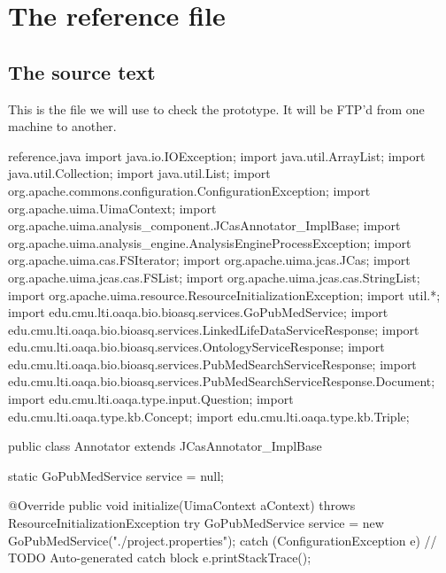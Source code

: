 \chapter{The reference file}
\section{The source text}
This is the file we will use to check the prototype. 
It will be FTP'd from one machine to another.
\begin{chunk}{reference.java}
import java.io.IOException;
import java.util.ArrayList;
import java.util.Collection;
import java.util.List;
import org.apache.commons.configuration.ConfigurationException;
import org.apache.uima.UimaContext;
import org.apache.uima.analysis_component.JCasAnnotator_ImplBase;
import org.apache.uima.analysis_engine.AnalysisEngineProcessException;
import org.apache.uima.cas.FSIterator;
import org.apache.uima.jcas.JCas;
import org.apache.uima.jcas.cas.FSList;
import org.apache.uima.jcas.cas.StringList;
import org.apache.uima.resource.ResourceInitializationException;
import util.*;
import edu.cmu.lti.oaqa.bio.bioasq.services.GoPubMedService;
import edu.cmu.lti.oaqa.bio.bioasq.services.LinkedLifeDataServiceResponse;
import edu.cmu.lti.oaqa.bio.bioasq.services.OntologyServiceResponse;
import edu.cmu.lti.oaqa.bio.bioasq.services.PubMedSearchServiceResponse;
import edu.cmu.lti.oaqa.bio.bioasq.services.PubMedSearchServiceResponse.Document;
import edu.cmu.lti.oaqa.type.input.Question;
import edu.cmu.lti.oaqa.type.kb.Concept;
import edu.cmu.lti.oaqa.type.kb.Triple;

public class Annotator extends JCasAnnotator_ImplBase {
  static GoPubMedService service = null;

  @Override
  public void initialize(UimaContext aContext) throws ResourceInitializationException {
    try {
      GoPubMedService service = new GoPubMedService("./project.properties");
    } catch (ConfigurationException e) {
      // TODO Auto-generated catch block
      e.printStackTrace();
    }
  }

}
\end{chunk}
